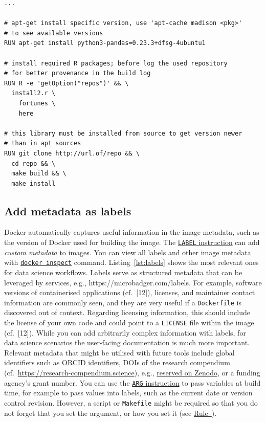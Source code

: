 \documentclass[10pt,letterpaper]{article}
\begin{document}
\begin{minipage}{\linewidth}

\begin{lstlisting}[language=docker,caption={Partial \texttt{Dockerfile} with examples for helpful comments.},breaklines=true,label={lst:comments}]
...

# apt-get install specific version, use 'apt-cache madison <pkg>' 
# to see available versions
RUN apt-get install python3-pandas=0.23.3+dfsg-4ubuntu1

# install required R packages; before log the used repository
# for better provenance in the build log
RUN R -e 'getOption("repos")' && \
  install2.r \
    fortunes \
    here

# this library must be installed from source to get version newer
# than in apt sources
RUN git clone http://url.of/repo && \
  cd repo && \
  make build && \
  make install
\end{lstlisting}

\end{minipage}

\normalsize

\hypertarget{add-metadata-as-labels}{%
\subsection{Add metadata as labels}\label{add-metadata-as-labels}}

Docker automatically captures useful information in the image metadata,
such as the version of Docker used for building the image. The
\href{https://docs.docker.com/engine/reference/builder/\#label}{\texttt{LABEL}
instruction} can add \emph{custom metadata} to images. You can view all
labels and other image metadata with
\href{https://docs.docker.com/engine/reference/commandline/inspect/}{\texttt{docker\ inspect}}
command. Listing~\ref{lst:labels} shows the most relevant ones for data
science workflows. Labels serve as structured metadata that can be
leveraged by services, e.g., https://microbadger.com/labels. For
example, software versions of containerised applications (cf.~{[}12{]}),
licenses, and maintainer contact information are commonly seen, and they
are very useful if a \texttt{Dockerfile} is discovered out of context.
Regarding licensing information, this should include the license of your
own code and could point to a \texttt{LICENSE} file within the image
(cf.~{[}12{]}). While you can add arbitrarily complex information with
labels, for data science scenarios the user-facing documentation is much
more important. Relevant metadata that might be utilised with future
tools include global identifiers such as \href{https://orcid.org/}{ORCID
identifiers}, DOIs of the research compendium
(cf.~\url{https://research-compendium.science}), e.g.,
\href{https://help.zenodo.org/}{reserved on Zenodo}, or a funding
agency's grant number. You can use the
\href{https://docs.docker.com/engine/reference/builder/\#arg}{\texttt{ARG}
instruction} to pass variables at build time, for example to pass values
into labels, such as the current date or version control revision.
However, a script or \texttt{Makefile} might be required so that you do
not forget that you set the argument, or how you set it (see
\hyperref[{rule:usage}]{Rule~}).
\end{document}
